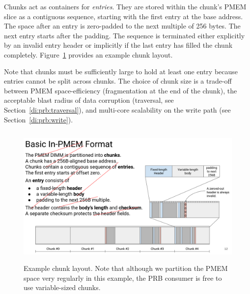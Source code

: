 \documentclass[12pt,a4paper,twoside]{book}
\begin{document}
Chunks act as containers for \textit{entries}.
They are stored within the chunk's PMEM slice as a contiguous sequence, starting with the first entry at the base address.
The space after an entry is zero-padded to the next multiple of 256 bytes.
The next entry starts after the padding.
The sequence is terminated either explicitly by an invalid entry header or implicitly if the last entry has filled the chunk completely.
Figure~\ref{fig:prb_physical_data_structure__chunklayout} provides an example chunk layout.

Note that chunks must be sufficiently large to hold at least one entry because entries cannot be split across chunks.
The choice of chunk size is a trade-off between PMEM space-efficiency (fragmentation at the end of the chunk), the acceptable blast radius of data corruption (traversal, see Section~\ref{di:prb:traversal}), and multi-core scalability on the write path (see Section~\ref{di:prb:write}).

\begin{figure}[h]
    \includegraphics[height=7cm]{fig/prb_persistent_structure__chunklayout}
    \caption{Example chunk layout. Note that although we partition the PMEM space very regularly in this example, the PRB consumer is free to use variable-sized chunks.}
    \label{fig:prb_physical_data_structure__chunklayout}
\end{figure}
\end{document}
